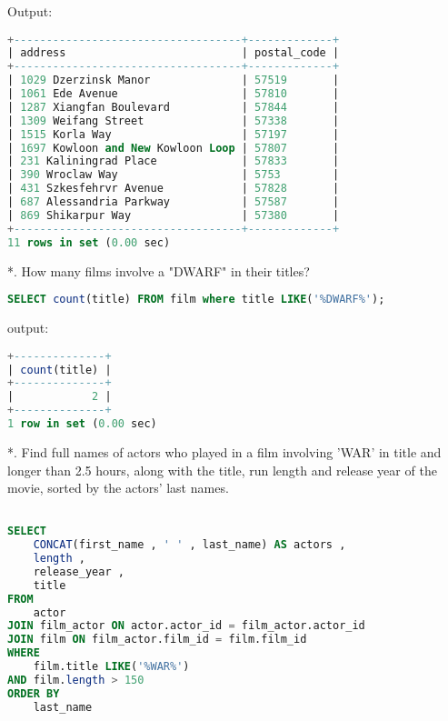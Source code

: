 \documentclass[12pt]{report}
\begin{document}
Output:
\begin{lstlisting}[language=sql]
+-----------------------------------+-------------+
| address                           | postal_code |
+-----------------------------------+-------------+
| 1029 Dzerzinsk Manor              | 57519       |
| 1061 Ede Avenue                   | 57810       |
| 1287 Xiangfan Boulevard           | 57844       |
| 1309 Weifang Street               | 57338       |
| 1515 Korla Way                    | 57197       |
| 1697 Kowloon and New Kowloon Loop | 57807       |
| 231 Kaliningrad Place             | 57833       |
| 390 Wroclaw Way                   | 5753        |
| 431 Szkesfehrvr Avenue            | 57828       |
| 687 Alessandria Parkway           | 57587       |
| 869 Shikarpur Way                 | 57380       |
+-----------------------------------+-------------+
11 rows in set (0.00 sec)
\end{lstlisting}

*. How many films involve a "DWARF" in their titles?
\begin{lstlisting}[language=sql]
SELECT count(title) FROM film where title LIKE('%DWARF%');
\end{lstlisting}
output:
\begin{lstlisting}[language=sql]
+--------------+
| count(title) |
+--------------+
|            2 |
+--------------+
1 row in set (0.00 sec)
\end{lstlisting}

*. Find full names of actors who played in a film involving ’WAR’ in title and longer than 2.5 hours, along with the title, run length and release year of the movie, sorted by the actors’ last names.
\begin{lstlisting}[language=sql]

SELECT
	CONCAT(first_name , ' ' , last_name) AS actors ,
	length ,
	release_year ,
	title
FROM
	actor
JOIN film_actor ON actor.actor_id = film_actor.actor_id
JOIN film ON film_actor.film_id = film.film_id
WHERE
	film.title LIKE('%WAR%')
AND film.length > 150
ORDER BY
	last_name
\end{lstlisting}
\end{document}
